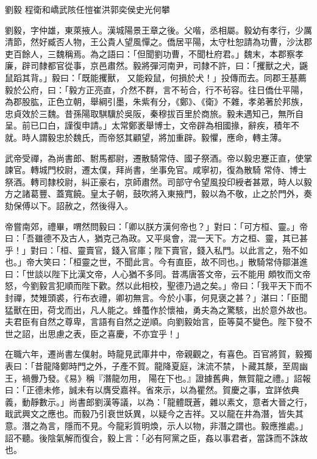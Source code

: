 
\begin{pinyinscope}
劉毅
 程衛和嶠武陔任愷崔洪郭奕侯史光何攀



 劉毅，字仲雄，東萊掖人。漢城陽景王章之後。父喈，丞相屬。毅幼有孝行，少厲清節，然好臧否人物，王公貴人望風憚之。僑居平陽，太守杜恕請為功曹，沙汰郡吏百餘人，三魏稱焉。為之語曰：「但聞劉功曹，不聞杜府君。」魏末，本郡察孝廉，辟司隸都官從事，京邑肅然。毅將彈河南尹，司隸不許，曰：「攫獸之犬，鼷鼠蹈其背。」毅曰：「既能攫獸，
 又能殺鼠，何損於犬！」投傳而去。同郡王基薦毅於公府，曰：「毅方正亮直，介然不群，言不茍合，行不茍容。往日僑仕平陽，為郡股肱，正色立朝，舉綱引墨，朱紫有分，《鄭》、《衛》不雜，孝弟著於邦族，忠貞效於三魏。昔孫陽取騏驥於吳阪，秦穆拔百里於商旅。毅未遇知己，無所自呈。前已口白，謹復申請。」太常鄭袤舉博士，文帝辟為相國掾，辭疾，積年不就。時人謂毅忠於魏氏，而帝怒其顧望，將加重辟。毅懼，應命，轉主薄。



 武帝受禪，為尚書郎、駙馬都尉，遷散騎常侍、國子祭酒。帝以毅忠蹇正直，使掌諫官。轉城門校尉，遷太僕，拜尚書，坐事免官。咸寧初，復為散騎
 常侍、博士祭酒。轉司隸校尉，糾正豪右，京師肅然。司部守令望風投印綬者甚眾，時人以毅方之諸葛豐、蓋寬饒。皇太子朝，鼓吹將入東掖門，毅以為不敬，止之於門外，奏劾保傅以下。詔赦之，然後得入。



 帝嘗南郊，禮畢，喟然問毅曰：「卿以朕方漢何帝也？」對曰：「可方桓、靈。」帝曰：「吾雖德不及古人，猶克己為政。又平吳會，混一天下。方之桓、靈，其已甚乎！」對曰：「桓、靈賣官，錢入官庫；陛下賣官，錢入私門。以此言之，殆不如也。」帝大笑曰：「桓靈之世，不聞此言。今有直臣，故不同也。」散騎常侍鄒湛進曰：「世談以陛下比漢文帝，人心猶不多同。昔馮唐答文帝，云不能用
 頗牧而文帝怒，今劉毅言犯順而陛下歡。然以此相校，聖德乃過之矣。」帝曰：「我平天下而不封禪，焚雉頭裘，行布衣禮，卿初無言。今於小事，何見褒之甚？」湛曰：「臣聞猛獸在田，荷戈而出，凡人能之。蜂蠆作於懷袖，勇夫為之驚駭，出於意外故也。夫君臣有自然之尊卑，言語有自然之逆順。向劉毅始言，臣等莫不變色。陛下發不世之詔，出思慮之表，臣之喜慶，不亦宜乎！」



 在職六年，遷尚書左僕射。時龍見武庫井中，帝親觀之，有喜色。百官將賀，毅獨表曰：「昔龍降鄭時門之外，子產不賀。龍降夏庭，沫流不禁，卜藏其漦，至周幽王，禍釁乃發。《易》稱『潛龍勿用，
 陽在下也。』證據舊典，無賀龍之禮。」詔報曰：「正德未修，誠未有以膺受嘉祥。省來示，以為瞿然。賀慶之事，宜詳依典義，動靜數示。」尚書郎劉漢等議，以為：「龍體既蒼，雜以素文，意者大晉之行，戢武興文之應也。而毅乃引衰世妖異，以疑今之吉祥。又以龍在井為潛，皆失其意。潛之為言，隱而不見。今龍彩質明煥，示人以物，非潛之謂也。毅應推處。」詔不聽。後陰氣解而復合，毅上言：「必有阿黨之臣，姦以事君者，當誅而不誅故也。




\end{pinyinscope}
